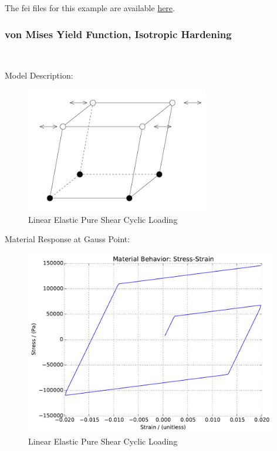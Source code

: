 \documentclass[fleqn,11pt]{article}
\begin{document}
The fei files for this example are available \href{https://github.com/yuan-energy/education_examples/tree/master/fei_examples/perfectly_plastic_pure_shear_solid/2pure_shear_cyclic_loading}{here}.


\newpage
\subsubsection{von Mises Yield Function, Isotropic Hardening} ~

Model Description:

\begin{figure}[H]
\begin{center}
\includegraphics[width=8cm]{../Figure-files/shear_cyclic_brick.JPG}
\caption{
\label{vmih Linear Elastic Pure Shear Cyclic Loadin}
Linear Elastic Pure Shear Cyclic Loading}
\end{center}
\end{figure}

Material Response at Gauss Point:

\begin{figure}[H]
\begin{center}
\includegraphics[width=11cm]{../fei_examples/isotropic_hardening_pure_shear/2pure_shear_cyclic_loading/result.pdf}
\caption{
\label{Results_vmih_Linear Elastic Pure Shear Cyclic Loadin}
Linear Elastic Pure Shear Cyclic Loading}
\end{center}
\end{figure}
\end{document}

